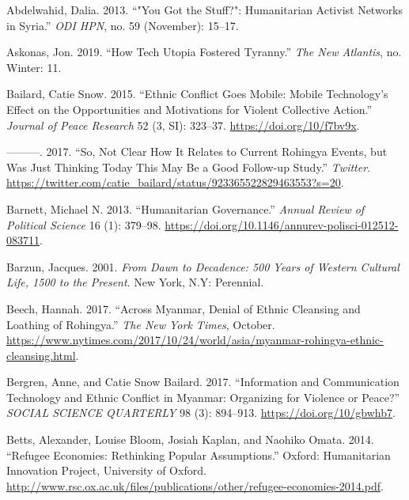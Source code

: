 \documentclass[
]{article}
\newlength{\cslhangindent}
\newenvironment{cslreferences}%
  {\setlength{\parindent}{0pt}%
  \everypar{\setlength{\hangindent}{\cslhangindent}}\ignorespaces}%
  {\par}
\begin{document}
\hypertarget{refs}{}
\begin{cslreferences}
\leavevmode\hypertarget{ref-Abdelwahid2013You}{}%
Abdelwahid, Dalia. 2013. ``"You Got the Stuff?": Humanitarian Activist
Networks in Syria.'' \emph{ODI HPN}, no. 59 (November): 15--17.

\leavevmode\hypertarget{ref-Askonas2019How}{}%
Askonas, Jon. 2019. ``How Tech Utopia Fostered Tyranny.'' \emph{The New
Atlantis}, no. Winter: 11.

\leavevmode\hypertarget{ref-Bailard2015Ethnic}{}%
Bailard, Catie Snow. 2015. ``Ethnic Conflict Goes Mobile: Mobile
Technology's Effect on the Opportunities and Motivations for Violent
Collective Action.'' \emph{Journal of Peace Research} 52 (3, SI):
323--37. \url{https://doi.org/10/f7bv9x}.

\leavevmode\hypertarget{ref-Bailard2017So}{}%
---------. 2017. ``So, Not Clear How It Relates to Current Rohingya
Events, but Was Just Thinking Today This May Be a Good Follow-up
Study.'' \emph{Twitter}.
\url{https://twitter.com/catie_bailard/status/923365522829463553?s=20}.

\leavevmode\hypertarget{ref-Barnett2013Humanitarian}{}%
Barnett, Michael N. 2013. ``Humanitarian Governance.'' \emph{Annual
Review of Political Science} 16 (1): 379--98.
\url{https://doi.org/10.1146/annurev-polisci-012512-083711}.

\leavevmode\hypertarget{ref-Barzun2001From}{}%
Barzun, Jacques. 2001. \emph{From Dawn to Decadence: 500 Years of
Western Cultural Life, 1500 to the Present}. New York, N.Y: Perennial.

\leavevmode\hypertarget{ref-Beech2017Across}{}%
Beech, Hannah. 2017. ``Across Myanmar, Denial of Ethnic Cleansing and
Loathing of Rohingya.'' \emph{The New York Times}, October.
\url{https://www.nytimes.com/2017/10/24/world/asia/myanmar-rohingya-ethnic-cleansing.html}.

\leavevmode\hypertarget{ref-Bergren2017Information}{}%
Bergren, Anne, and Catie Snow Bailard. 2017. ``Information and
Communication Technology and Ethnic Conflict in Myanmar: Organizing for
Violence or Peace?'' \emph{SOCIAL SCIENCE QUARTERLY} 98 (3): 894--913.
\url{https://doi.org/10/gbwhb7}.

\leavevmode\hypertarget{ref-Betts2014Refugee}{}%
Betts, Alexander, Louise Bloom, Josiah Kaplan, and Naohiko Omata. 2014.
``Refugee Economies: Rethinking Popular Assumptions.'' Oxford:
Humanitarian Innovation Project, University of Oxford.
\url{http://www.rsc.ox.ac.uk/files/publications/other/refugee-economies-2014.pdf}.


\end{cslreferences}
\end{document}

